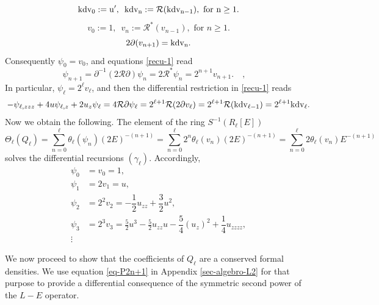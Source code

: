 \documentclass[a4paper,12pt]{article}
\newcommand{\cR}{\mathcal{R}}
\def\kdv{\rm kdv}
\begin{document}
\begin{equation}\label{eq-kdv-cd}
\kdv_0:=u',\,\,\, \kdv_n:=\cR(\kdv_{n-1}),\mbox{ for }n\geq 1.
\end{equation}
\begin{equation}\label{eq-fn-cd}
v_0:=1,\,\,\, v_n:=\cR^*(v_{n-1}),\mbox{ for }n\geq 1.
\end{equation}
\begin{equation}\label{eq-vkdv-cd}
2\partial(v_{n+1})=\kdv_n.
\end{equation}
Consequently $\psi_0=v_0$, and equations \eqref{recu-1} read 
\[
 \psi_{n+1}  =\partial^{-1} (2\cR \partial ) \psi_n = 2 \cR^* \psi_n = 2^{n+1} v_{n+1} .
 \quad , \quad 
\]
In particular, {$\psi_{\ell} =2^{\ell} v_{\ell}  $}, and then the differential restriction in \eqref{recu-1} reads
\[
 -\psi_{\ell,zzz}+4 u\psi_{\ell,z} +2u_z \psi_\ell = 4\cR \partial \psi_\ell = 2^{\ell+1}\cR (2\partial  v_{\ell})=  2^{\ell+1}\cR (\kdv_{\ell-1} )= 2^{\ell+1}\kdv_{\ell}.
\]
Now we obtain the following. The element of the ring $S^{-1} ( R_\ell [E])$
\begin{equation}
   \Theta_\ell  (Q_\ell ) =  \sum_{n=0}^\ell \theta_\ell (\psi_n ) (2E)^{-(n+1)} = \sum_{n=0}^\ell 
   2^{n}\theta_\ell ( v_{n} )  (2E)^{-(n+1)} = 
   \sum_{n=0}^\ell 
   2\theta_\ell ( v_{n} )  E^{-(n+1)}
\end{equation}
solves the differential recursions $(\gamma_\ell )$. Accordingly, 
\begin{equation}
\begin{array}{rl}
 \psi_0&=v_0=1,\\ 
\psi_1&=2 v_1 =u,\\ 
 \psi_2&=2^2 v_2 =-\dfrac12 u_{zz}+\dfrac32 u^2, \\ 
\psi_3&=2^3 v_3 = \frac52 u^3 -\frac52 u_{zz}u -\dfrac{ 5}{4}(u_z )^2  +\dfrac{ 1}{4} u_{zzzz},\\
\vdots
\end{array}
\end{equation}


We now proceed to show that the coefficients of $Q_\ell$ are a conserved formal  densities. We use equation \eqref{eq-P2n+1} in Appendix \ref{sec-algebro-L2} for that purpose to provide a differential consequence of the symmetric second power of the $L-E$ operator.

\medskip
\end{document}
